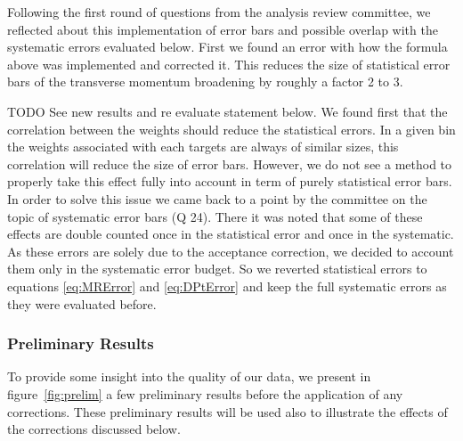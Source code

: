 Following the first round of questions from the analysis review committee, we
reflected about this implementation of error bars and possible overlap with the 
systematic errors evaluated below. First we found an error with how the formula
above was implemented and corrected it. This reduces the size of statistical 
error bars of the transverse momentum broadening by roughly a factor 2 to 3. 

TODO See new results and re evaluate statement below.
We found first that the correlation between the weights should reduce
the statistical errors. In a given bin the weights associated with each 
targets are always of similar sizes, this correlation will reduce the size of 
error bars. However, we do not see a method to properly take this 
effect fully into account in term of purely statistical error bars. In order
to solve this issue we came back to a point by the committee on the topic of 
systematic error bars (Q 24). There it was noted that some of these effects are
double counted once in the statistical error and once in the systematic. As these
errors are solely due to the acceptance correction, we decided to account them 
only in the systematic error budget. So we reverted statistical errors to equations
\ref{eq:MRError} and \ref{eq:DPtError} and keep the full systematic errors as they
were evaluated before.

\subsubsection{Preliminary Results}
\label{prelim}

To provide some insight into the quality of our data, we present in 
figure~\ref{fig:prelim} a few preliminary results before the application of 
any corrections. These preliminary results will be used also to illustrate 
the effects of the corrections discussed below.

